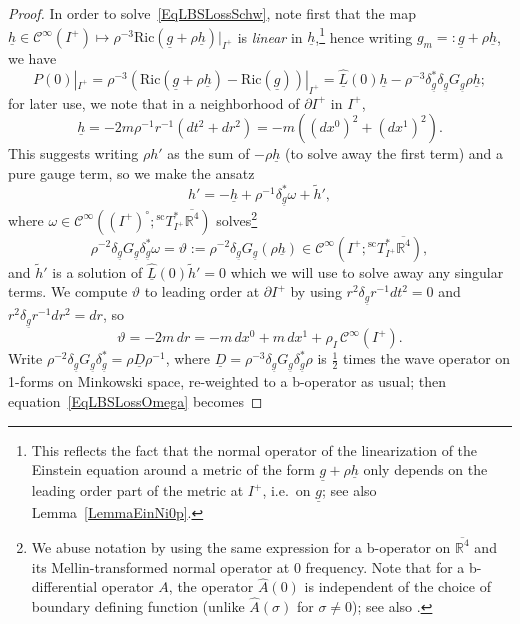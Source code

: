 \documentclass[reqno,11pt,letterpaper]{amsart}
\numberwithin{equation}{section}
\numberwithin{figure}{section}
\theoremstyle{definition}
\theoremstyle{remark}
\newcommand{\mc}{\mathcal}
\newcommand{\cC}{\mc C}
\newcommand{\R}{\mathbb{R}}
\newcommand{\ol}{\overline}
\newcommand{\pa}{\partial}
\newcommand{\ul}[1]{\underline{#1}{}}
\newcommand{\wh}{\widehat}
\newcommand{\wt}{\widetilde}
\newcommand{\scl}{{\mathrm{sc}}}
\newcommand{\Tsc}{{}^{\scl}T}
\newcommand{\half}{\tfrac{1}{2}}
\newcommand{\CI}{\cC^\infty}
\newcommand{\Ric}{\mathrm{Ric}}
\begin{document}
\begin{proof}
  In order to solve~\eqref{EqLBSLossSchw}, note first that the map $\ul h\in\CI(I^+)\mapsto\rho^{-3}\Ric(\ul g+\rho\ul h)|_{I^+}$ is \emph{linear} in $\ul h$,\footnote{This reflects the fact that the normal operator of the linearization of the Einstein equation around a metric of the form $\ul g+\rho\ul h$ only depends on the leading order part of the metric at $I^+$, i.e.\ on $\ul g$; see also Lemma~\ref{LemmaEinNi0p}.} hence writing $g_m=:\ul g+\rho\ul h$, we have
  \[
    P(0)|_{I^+}=\rho^{-3}(\Ric(\ul g+\rho\ul h)-\Ric(\ul g))|_{I^+} = \wh{\ul L}(0)\ul h - \rho^{-3}\delta^*_{\ul g}\delta_{\ul g}G_{\ul g}\rho\ul h;
  \]
  for later use, we note that in a neighborhood of $\pa I^+$ in $I^+$,
  \begin{equation}
  \label{EqLBSLossulh}
    \ul h=-2 m \rho^{-1}r^{-1}(d t^2+d r^2)=-m((d x^0)^2+(d x^1)^2).
  \end{equation}
  This suggests writing $\rho h'$ as the sum of $-\rho\ul h$ (to solve away the first term) and a pure gauge term, so we make the ansatz
  \begin{equation}
  \label{EqLBSLossHprimeAnsatz}
    h'=-\ul h+\rho^{-1}\delta^*_{\ul g}\omega+\wt h',
  \end{equation}
  where $\omega\in\CI((I^+)^\circ;\Tsc^*_{I^+}\ol{\R^4})$ solves\footnote{We abuse notation by using the same expression for a b-operator on $\ol{\R^4}$ and its Mellin-transformed normal operator at $0$ frequency. Note that for a b-differential operator $A$, the operator $\wh{A}(0)$ is independent of the choice of boundary defining function (unlike $\wh{A}(\sigma)$ for $\sigma\neq 0$); see also \cite[p.~762]{VasyPropagationCorners}.}
  \begin{equation}
  \label{EqLBSLossOmega}
    \rho^{-2}\delta_{\ul g}G_{\ul g}\delta_{\ul g}^*\omega = \vartheta := \rho^{-2}\delta_{\ul g}G_{\ul g}(\rho\ul h) \in \CI(I^+;\Tsc_{I^+}^*\ol{\R^4}),
  \end{equation}
  and $\wt h'$ is a solution of $\wh{\ul L}(0)\wt h'=0$ which we will use to solve away any singular terms. We compute $\vartheta$ to leading order at $\pa I^+$ by using $r^2\delta_{\ul g}r^{-1} d t^2=0$ and $r^2\delta_{\ul g}r^{-1} d r^2=d r$, so
  \[
    \vartheta = -2 m\,d r = -m\,d x^0+m\,d x^1 + \rho_I\,\CI(I^+).
  \]
  Write $\rho^{-2}\delta_{\ul g}G_{\ul g}\delta_{\ul g}^*=\rho\ul D\rho^{-1}$, where $\ul D=\rho^{-3}\delta_{\ul g}G_{\ul g}\delta_{\ul g}^*\rho$ is $\half$ times the wave operator on 1-forms on Minkowski space, re-weighted to a b-operator as usual; then equation~\eqref{EqLBSLossOmega} becomes

\end{proof}
\end{document}
